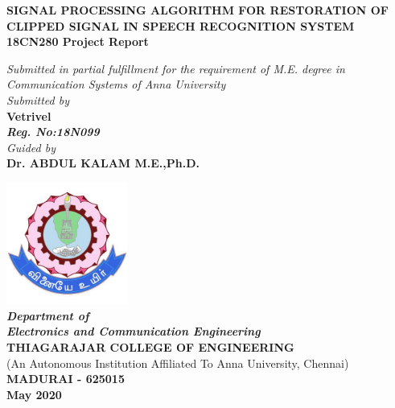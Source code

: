 \documentclass[a4paper,12pt]{report} %
\makeatletter
\newcommand\frontmatter{%
    \cleardoublepage
  \pagenumbering{roman}}
\makeatother
\begin{document}
\frontmatter
{}

\begin{titlepage}
   \begin{center}
 
   \Large
   {\textbf{SIGNAL PROCESSING ALGORITHM FOR
RESTORATION OF CLIPPED SIGNAL IN SPEECH RECOGNITION SYSTEM}}\\
 \large
       \vspace{0.5cm}
        \textbf{18CN280 Project Report }
 
   \vspace{1cm}
  \large
    \textit{Submitted in partial fulfillment for the requirement of M.E. degree in\\
        Communication Systems of Anna University}\\
         \vspace{0.75cm}
  \textit{Submitted by}\\
       \textbf{Vetrivel}\\
       \textit{\textbf{Reg. No:18N099}}\\
          \vspace{0.5cm}
         \textit{Guided by}\\
       \textbf{Dr. ABDUL KALAM M.E.,Ph.D.}\\
 
       \vfill
 
 
       \includegraphics[width=0.3\textwidth]{TCE}\\
  \large\textit{\textbf{Department of\\ Electronics and Communication Engineering}}\\
      \Large\textbf{THIAGARAJAR COLLEGE OF ENGINEERING}\\
       \normalsize (An Autonomous Institution Affiliated To Anna University, Chennai)\\
        \Large\textbf{MADURAI - 625015}\\
       \large \textbf{May 2020}
 
   \end{center}
\end{titlepage}
\setcounter{secnumdepth}{-2}
\end{document}
